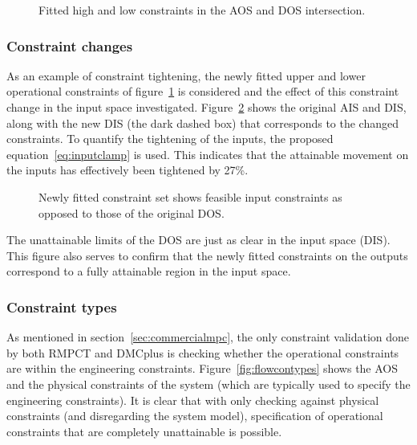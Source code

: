 \begin{figure}[htbp]
  \centering
    \scalebox{1}{}  
  \caption{Fitted high and low constraints in the AOS and DOS intersection.}
  \label{fig:flowfitbox}
\end{figure}

\subsubsection{Constraint changes}
As an example of constraint tightening, the newly fitted upper and lower operational constraints of figure~\ref{fig:flowfitbox} is considered and the effect of this constraint change in the input space investigated.
Figure~\ref{fig:flowconsinput} shows the original AIS and DIS, along with the new DIS (the dark dashed box) that corresponds to the changed constraints.
To quantify the tightening of the inputs, the proposed equation~\ref{eq:inputclamp} is used.
This indicates that the attainable movement on the inputs has effectively been tightened by 27\%. 

\begin{figure}[htbp]
  \centering
    \scalebox{1}{}  
  \caption[AIS, DIS and newly fitted DIS of level and flow rig]{Newly fitted constraint set shows feasible input constraints as opposed to those of the original DOS.}
  \label{fig:flowconsinput}
\end{figure}

The unattainable limits of the DOS are just as clear in the input space (DIS).
This figure also serves to confirm that the newly fitted constraints on the outputs correspond to a fully attainable region in the input space.

\subsubsection{Constraint types}
As mentioned in section~\ref{sec:commercialmpc}, the only constraint validation done by both RMPCT and DMCplus is checking whether the operational constraints are within the engineering constraints.
Figure~\ref{fig:flowcontypes} shows the AOS and the physical constraints of the system (which are typically used to specify the engineering constraints).
It is clear that with only checking against physical constraints (and disregarding the system model), specification of operational constraints that are completely unattainable is possible.

